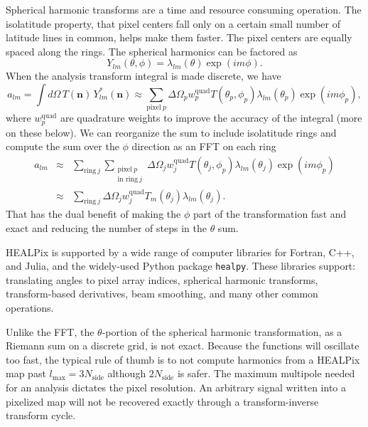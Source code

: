 Spherical harmonic transforms are a time and resource consuming operation.  The isolatitude property, that pixel centers fall only on a certain small number of latitude lines in common, helps make them faster.  The pixel centers are equally spaced along the rings.  The spherical harmonics can be factored as
\begin{equation}
  Y_{lm}(\theta,\phi) = \lambda_{lm}(\theta) \exp(im\phi).
\end{equation}
When the analysis transform integral is made discrete, we have
\begin{equation}
    a_{lm} = \int d\Omega\, T(\mathbf{n})\, Y^*_{lm}(\mathbf{n}) \approx \sum_{\textrm{pixel}\ p}\Delta\Omega_p w^\textrm{quad}_p T(\theta_p,\phi_p) \lambda_{lm}(\theta_p) \exp(im\phi_p),
\end{equation}
where $w^\textrm{quad}_p$ are quadrature weights to improve the accuracy of the integral (more on these below).  We can reorganize the sum to include isolatitude rings and compute the sum over the $\phi$ direction as an FFT on each ring
\begin{eqnarray}
  a_{lm}  &\approx& \sum_{\textrm{ring}\ j} \sum_{\substack{\textrm{pixel}\ p\\ \textrm{in\ ring}\ j}} \Delta\Omega_j w^\textrm{quad}_j T(\theta_j,\phi_p) \lambda_{lm}(\theta_j) \exp(im\phi_p) \\ \nonumber
  & \approx & \sum_{\textrm{ring}\ j} \Delta\Omega_j w^\textrm{quad}_j T_m(\theta_j)  \lambda_{lm}(\theta_j).
\end{eqnarray}
That has the dual benefit of making the $\phi$ part of the transformation fast and exact and reducing the number of steps in the $\theta$ sum. 

HEALPix is supported by a wide range of computer libraries for Fortran, C++, and Julia, and the widely-used Python package \texttt{healpy}.  These libraries support: translating angles to pixel array indices, spherical harmonic transforms, transform-based derivatives, beam smoothing, and many other common operations.

Unlike the FFT, the $\theta$-portion of the spherical harmonic transformation, as a Riemann sum on a discrete grid, is not exact.  Because the functions will oscillate too fast, the typical rule of thumb is to not compute harmonics from a HEALPix map past $l_\textrm{max} = 3 N_\textrm{side}$ although $2 N_\textrm{side}$ is safer.  The maximum multipole needed for an analysis dictates the pixel resolution.  An arbitrary signal written into a pixelized map will not be recovered exactly through a transform-inverse transform cycle.

